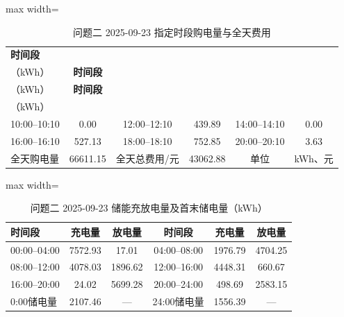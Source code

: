 \documentclass[UTF8,a4paper,zihao=-4,fontset=windows]{ctexart}
\begin{document}
\begin{table}[H]\centering
\fontsize{9.5}{12}\selectfont\setlength{\tabcolsep}{4pt}\renewcommand{\arraystretch}{1.12}
\begin{adjustbox}{max width=\linewidth}\begin{tabular}{lccccc}\toprule
\textbf{时间段} & \shortstack{\textbf{购电量}\\{\normalfont （kWh）}} & \textbf{时间段} & \shortstack{\textbf{购电量}\\{\normalfont （kWh）}} & \textbf{时间段} & \shortstack{\textbf{购电量}\\{\normalfont （kWh）}}\\\midrule
10:00–10:10 & 0.00 & 12:00–12:10 & 439.89 & 14:00–14:10 & 0.00\\
16:00–16:10 & 527.13 & 18:00–18:10 & 752.85 & 20:00–20:10 & 3.63\\
全天购电量 & 66611.15 & 全天总费用/元 & 43062.88 & 单位 & kWh、元\\
\bottomrule\end{tabular}\end{adjustbox}
\caption{问题二 2025-09-23 指定时段购电量与全天费用}
\end{table}
\begin{table}[H]\centering
\fontsize{9.5}{12}\selectfont\setlength{\tabcolsep}{4pt}\renewcommand{\arraystretch}{1.12}
\begin{adjustbox}{max width=\linewidth}\begin{tabular}{lccccc}\toprule
\textbf{时间段} & \textbf{充电量} & \textbf{放电量} & \textbf{时间段} & \textbf{充电量} & \textbf{放电量}\\\midrule
00:00–04:00 & 7572.93 & 17.01 & 04:00–08:00 & 1976.79 & 4704.25\\
08:00–12:00 & 4078.03 & 1896.62 & 12:00–16:00 & 4448.31 & 660.67\\
16:00–20:00 & 24.02 & 5699.28 & 20:00–24:00 & 498.69 & 2583.15\\
0:00储电量 & 2107.46 & — & 24:00储电量 & 1556.39 & —\\
\bottomrule\end{tabular}\end{adjustbox}
\caption{问题二 2025-09-23 储能充放电量及首末储电量（kWh）}
\end{table}
\end{document}
